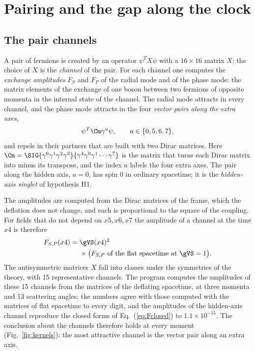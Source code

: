 \section{Pairing and the gap along the clock}
\label{sec:gap}

\subsection{The pair channels}

A pair of fermions is created by an operator $\psi^{T}X\psi$ with a $16\times16$ matrix $X$; the
choice of $X$ is the \emph{channel} of the pair. For each channel one computes the \emph{exchange amplitudes} $F_S$ and $F_P$ of the radial mode and of the
phase mode: the matrix elements of the exchange of one boson between two fermions of opposite
momenta in the internal state of the channel. The radial mode attracts in every
channel, and the phase mode attracts in the four \emph{vector pairs along the extra axes},
\begin{equation}
\psi^{T}\Cm\gamma^{a}\psi,\qquad a\in\{0,5,6,7\},
\label{eq:pairs}
\end{equation}
and repels in their partners that are built with two Dirac matrices. Here
$\Cm=\SIG{\gamma^{0}\gamma^{1}\gamma^{2}\gamma^{3}}{\gamma^{4}\gamma^{0}\gamma^{1}\cdots\gamma^{7}}$
is the matrix that turns each Dirac matrix into minus its transpose, and the index $a$ labels the
four extra axes. The pair along the hidden axis, $a=0$, has spin 0 in ordinary spacetime; it is the
\emph{hidden-axis singlet} of hypothesis H1.

The amplitudes are computed from the Dirac matrices of the frame, which the deflation does not
change, and each is proportional to the square of the coupling. For fields that do not depend on
$x5,x6,x7$ the amplitude of a channel at the time $x4$ is therefore
\begin{equation}
\begin{aligned}
F_{S,P}(x4)={}&\gVS(x4)^{2}\\
&\times\big(F_{S,P}\text{ of the flat spacetime at }\gVS=1\big).
\end{aligned}
\label{eq:amplitudes}
\end{equation}
The antisymmetric matrices $X$ fall into classes under the symmetries of the theory, with 15
representative channels. The program computes the amplitudes of these 15 channels from the
matrices of the deflating spacetime, at three momenta and 13 scattering angles; the numbers agree
with those computed with the matrices of flat spacetime to every digit,
and the amplitudes of the hidden-axis channel reproduce the closed forms of Eq.~(\ref{eq:Fclosed}) to $1.1\times10^{-15}$. The
conclusion about the channels therefore holds at every moment
(Fig.~\ref{fig:kernels}): the most attractive channel is the vector pair along an extra axis.

